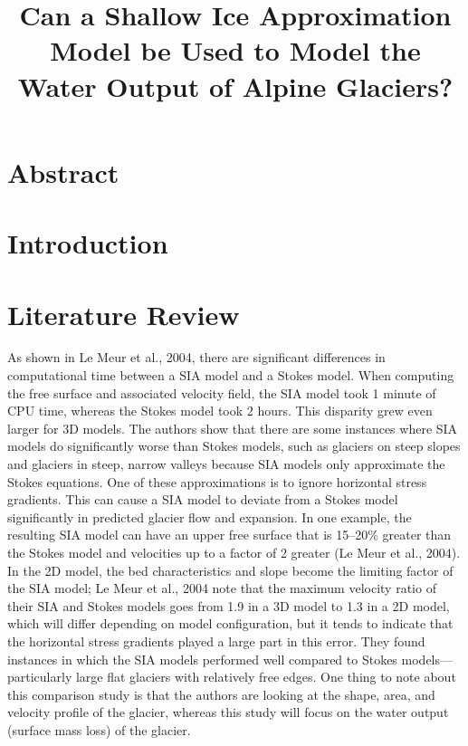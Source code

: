 \documentclass{article}
\title{Can a Shallow Ice Approximation Model be Used to Model the Water Output of Alpine Glaciers?}
\author{}
\date{}
\begin{document}
\maketitle

\section*{Abstract}

\section{Introduction}

\section{Literature Review}
    As shown in Le Meur et al., 2004, there are significant differences in computational time between a SIA model and a Stokes model. When 
computing the free surface and associated velocity field, the SIA model took 1 minute of CPU time, whereas the Stokes model took 2 hours. 
This disparity grew even larger for 3D models. The authors show that there are some instances where SIA models do significantly worse than 
Stokes models, such as glaciers on steep slopes and glaciers in steep, narrow valleys because SIA models only approximate the Stokes 
equations. One of these approximations is to ignore horizontal stress gradients. This can cause a SIA model to deviate from a Stokes model 
significantly in predicted glacier flow and expansion. In one example, the resulting SIA model can have an upper free surface that is 
15--20\% greater than the Stokes model and velocities up to a factor of 2 greater (Le Meur et al., 2004). In the 2D model, the bed 
characteristics and slope become the limiting factor of the SIA model; Le Meur et al., 2004 note that the maximum velocity ratio of their 
SIA and Stokes models goes from 1.9 in a 3D model to 1.3 in a 2D model, which will differ depending on model configuration, but it tends to 
indicate that the horizontal stress gradients played a large part in this error. They found instances in which the SIA models performed well 
compared to Stokes models---particularly large flat glaciers with relatively free edges. One thing to note about this comparison study is 
that the authors are looking at the shape, area, and velocity profile of the glacier, whereas this study will focus on the water output 
(surface mass loss) of the glacier.
\end{document}

